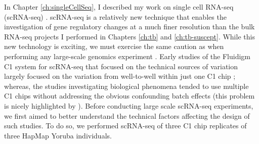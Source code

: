 In Chapter \ref{ch:singleCellSeq}, I described my work on single cell
RNA-seq (scRNA-seq) \citep{Tung2016}. scRNA-seq is a relatively new
technique \citep{Liang2014, Macaulay2014, Saliba2014, Grun2015,
  Stegle2015, Bacher2016} that enables the investigation of gene
regulatory changes at a much finer resolution than the bulk RNA-seq
projects I performed in Chapters \ref{ch:tb} and
\ref{ch:tb-suscept}. While this new technology is exciting, we must
exercise the same caution as when performing any large-scale genomics
experiment \citep{Auer2010, Leek2010, Gilad2015}. Early studies of the
Fluidigm C1 system for scRNA-seq that focused on the technical sources
of variation largely focused on the variation from well-to-well within
just one C1 chip \citep{Brennecke2013, Grun2014, Islam2014, Ding2015,
  Vallejos2015} ; whereas, the studies investigating biological
phenomena tended to use multiple C1 chips without addressing the
obvious confounding batch effects (this problem is nicely highlighted
by \citep{Hicks2015}). Before conducting large scale scRNA-seq
experiments, we first aimed to better understand the technical factors
affecting the design of such studies. To do so, we performed scRNA-seq
of three C1 chip replicates of three HapMap \citep{HapMap2005} Yoruba
individuals.

